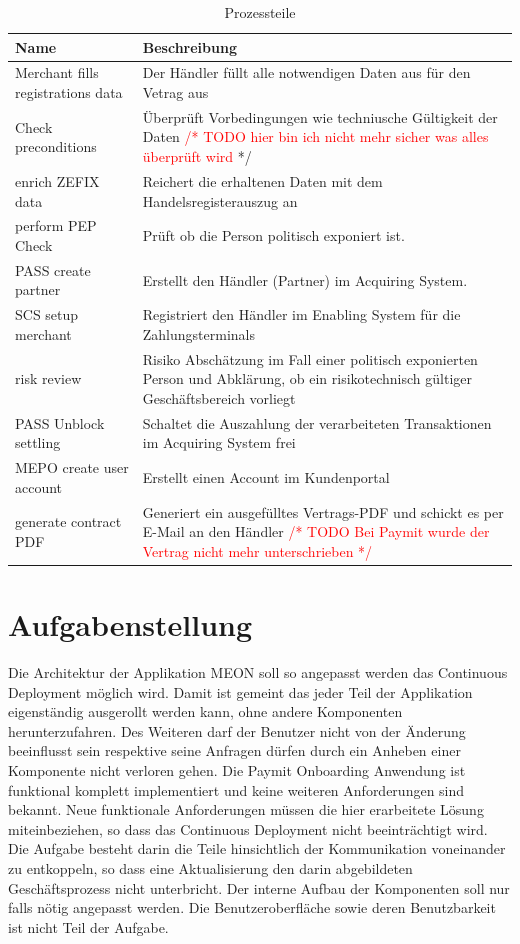 \begin{table}[H]
	\centering
	\caption{Prozessteile}
	\begin{tabular}{ | p{4cm} | p{12cm} | }
		\toprule
		{\textbf{Name}} & {\textbf{Beschreibung}} \\
		\midrule
		Merchant fills registrations data & Der Händler füllt alle notwendigen Daten aus für den Vetrag aus \\ \hline
		Check preconditions & Überprüft Vorbedingungen wie techniusche Gültigkeit der Daten \textcolor{red}{/* TODO  hier bin ich nicht mehr sicher was alles überprüft wird} */ \\ \hline
		enrich ZEFIX data & Reichert die erhaltenen Daten mit dem Handelsregisterauszug an \\ \hline
		perform PEP Check & Prüft ob die Person politisch exponiert ist. \\ \hline
		PASS create partner & Erstellt den Händler (Partner) im Acquiring System.\\ \hline
		SCS setup merchant & Registriert den Händler im Enabling System für die Zahlungsterminals \\ \hline
		risk review  & Risiko Abschätzung im Fall einer politisch exponierten Person und Abklärung, ob ein risikotechnisch gültiger Geschäftsbereich vorliegt \\ \hline
	    PASS Unblock settling & Schaltet die Auszahlung der verarbeiteten Transaktionen im Acquiring System frei \\ \hline
	    MEPO create user account&  Erstellt einen Account im Kundenportal \\ \hline
	    generate contract PDF & Generiert ein ausgefülltes Vertrags-PDF und schickt es per E-Mail an den Händler \textcolor{red}{/* TODO Bei Paymit wurde der Vertrag nicht mehr unterschrieben */}  \\
		\bottomrule
	\end{tabular}
\end{table}

\section{Aufgabenstellung}

Die Architektur der Applikation MEON soll so angepasst werden das Continuous Deployment möglich wird. Damit ist gemeint das jeder Teil der Applikation eigenständig ausgerollt werden kann, ohne andere Komponenten herunterzufahren. Des Weiteren darf der Benutzer nicht von der Änderung beeinflusst sein respektive seine Anfragen dürfen durch ein Anheben einer Komponente nicht verloren gehen.
Die Paymit Onboarding Anwendung ist funktional komplett implementiert und keine weiteren Anforderungen sind bekannt. Neue funktionale Anforderungen müssen die hier erarbeitete Lösung miteinbeziehen, so dass das Continuous Deployment nicht beeinträchtigt wird.
Die Aufgabe besteht darin die Teile hinsichtlich der Kommunikation voneinander zu entkoppeln, so dass eine Aktualisierung den darin abgebildeten Geschäftsprozess nicht unterbricht.  Der interne Aufbau der Komponenten soll nur falls nötig angepasst werden. Die Benutzeroberfläche sowie deren Benutzbarkeit ist nicht Teil der Aufgabe.

